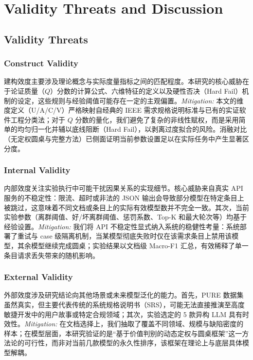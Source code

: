 \documentclass[a4paper,11pt]{ctexart}
\begin{document}
\section{Validity Threats and Discussion}
\label{sec:validity}
\subsection{Validity Threats}
\subsubsection{Construct Validity}
建构效度主要涉及理论概念与实际度量指标之间的匹配程度。本研究的核心威胁在于论证质量（$Q$）分数的计算公式、六维特征的定义以及硬性否决（Hard Fail）机制的设定，这些规则与经验阈值可能存在一定的主观偏置。\textit{Mitigation:} 本文的维度定义（U/A/C/V）严格映射自经典的 IEEE 需求规格说明标准与已有的实证软件工程分类法；对于 $Q$ 分数的量化，我们避免了复杂的非线性赋权，而是采用简单的均匀归一化并辅以底线阻断（Hard Fail），以剥离过度拟合的风险。消融对比（无定权圆桌与完整方法）已侧面证明当前参数设置足以在实际任务中产生显著区分度。

\subsubsection{Internal Validity}
内部效度关注实验执行中可能干扰因果关系的实现细节。核心威胁来自真实 API 服务的不稳定性：限流、超时或非法的 JSON 输出会导致部分模型在特定条目上被跳过，这意味着不同文档或条目上的实际有效模型数并不完全一致。其次，当前实验参数（离群阈值、好/坏离群阈值、惩罚系数、Top-K 和最大轮次等）均基于经验设置。\textit{Mitigation:} 我们将 API 不稳定性显式纳入系统的稳健性考量：系统部署了重试与 case 级隔离机制，当某模型彻底失败时仅在该需求条目上禁用该模型，其余模型继续完成圆桌；实验结果以文档级 Macro-F1 汇总，有效稀释了单一条目请求丢失带来的随机影响。

\subsubsection{External Validity}
外部效度涉及研究结论向其他场景或未来模型泛化的能力。首先，PURE 数据集虽然真实，但主要代表传统的系统规格说明书（SRS），可能无法直接推演至高度敏捷开发中的用户故事或特定合规领域；其次，实验选定的 5 款异构 LLM 具有时效性。\textit{Mitigation:} 在文档选择上，我们抽取了覆盖不同领域、规模与缺陷密度的样本；在模型层面，本研究验证的是“基于价值判别的动态定权与圆桌框架”这一方法论的可行性，而非对当前几款模型的永久性排序，该框架在理论上与底层具体模型解耦。
\end{document}
